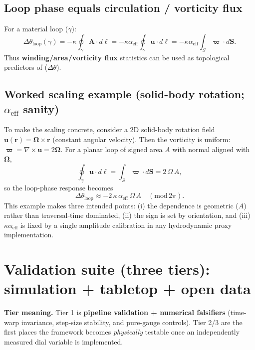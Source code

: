 ﻿\documentclass[twocolumn,aps,prd,nofootinbib]{revtex4-2}
\begin{document}
\subsection{Loop phase equals circulation / vorticity flux}
For a material loop ($\gamma$):
\begin{equation}
\Delta\theta_{\mathrm{loop}}(\gamma) = -\kappa\oint_\gamma \mathbf{A}\cdot d\mathbf{\ell}
= -\kappa\alpha_{\mathrm{eff}}\oint_\gamma \mathbf{u}\cdot d\mathbf{\ell}
= -\kappa\alpha_{\mathrm{eff}}\int_S \boldsymbol{\varpi}\cdot d\mathbf{S}.
\end{equation}
Thus \textbf{winding/area/vorticity flux} statistics can be used as topological predictors of ($\Delta\theta$). 

\subsection{Worked scaling example (solid-body rotation; $\alpha_{\mathrm{eff}}$ sanity)}
To make the scaling concrete, consider a 2D solid-body rotation field $\mathbf u(\mathbf r)=\boldsymbol{\Omega}\times\mathbf r$ (constant angular velocity). Then the vorticity is uniform: $\boldsymbol{\varpi}=\nabla\times\mathbf u=2\boldsymbol{\Omega}$. For a planar loop of signed area $A$ with normal aligned with $\boldsymbol{\Omega}$,
\begin{equation}
\oint_\gamma \mathbf u\cdot d\boldsymbol{\ell}=\int_S \boldsymbol{\varpi}\cdot d\mathbf S = 2\,\Omega\,A,
\end{equation}
so the loop-phase response becomes
\begin{equation}
\Delta\theta_{\mathrm{loop}}\approx -2\,\kappa\,\alpha_{\mathrm{eff}}\,\Omega\,A\quad(\mathrm{mod}\,2\pi).
\end{equation}
This example makes three intended points: (i) the dependence is geometric ($A$) rather than traversal-time dominated, (ii) the sign is set by orientation, and (iii) $\kappa\alpha_{\mathrm{eff}}$ is fixed by a single amplitude calibration in any hydrodynamic proxy implementation.

\section{Validation suite (three tiers): simulation + tabletop + open data}

\noindent\textbf{Tier meaning.} Tier 1 is \textbf{pipeline validation + numerical falsifiers} (time-warp invariance, step-size stability, and pure-gauge controls). Tier 2/3 are the first places the framework becomes \emph{physically} testable once an independently measured dial variable is implemented.
\end{document}
